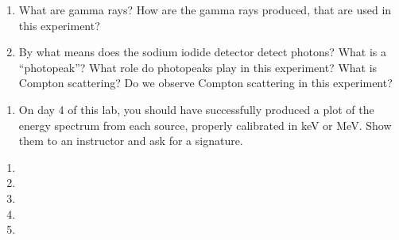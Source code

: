 \documentclass{../signatures}
\begin{document}
\maketitle

\names

\gmasafty

\prelab

\begin{enumerate}
    \item What are gamma rays? How are the gamma rays produced, that are used in this experiment?
    \item By what means does the sodium iodide detector detect photons? What is a ``photopeak''? What role do photopeaks play in this experiment? What is Compton scattering? Do we observe Compton scattering in this experiment?
    \\[32pt]
\end{enumerate}

\prelabsignatures

\midlab

\begin{enumerate}
    \item On day 4 of this lab, you should have successfully produced a plot of the energy spectrum from each source, properly calibrated in keV or MeV. Show them to an instructor and ask for a signature.
    \\[32pt]
\end{enumerate}


\checkpointsection 

\begin{enumerate}

\item {}

\item {}

\item {}

\item {}

\item {}

\end{enumerate}
\end{document}
